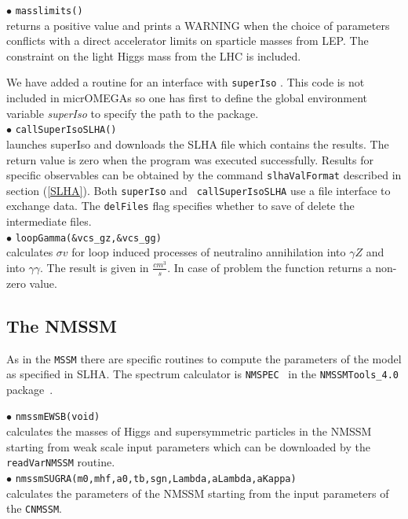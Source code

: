 \documentclass[12pt,a4paper]{article}
\begin{document}
 
\noi$\bullet$ \verb|masslimits()|\\
returns a positive value  and
 prints a WARNING when the choice of parameters conflicts with a
direct accelerator limits on sparticle masses from LEP.
The constraint on the light Higgs mass from the LHC is included.  

We have added a routine for an interface with {\tt superIso}
\cite{Arbey:2011zz}. This code is not 
included in micrOMEGAs so one has first to define 
the global environment  variable {\it superIso} 
to specify the path to the package.\\ 
\noi$\bullet$ \verb|callSuperIsoSLHA()|\\
launches superIso and downloads the SLHA file which  contains the results. The
return value is zero when the program was  executed successfully.  Results
for specific  observables can be obtained by the command {\tt slhaValFormat}
described in  section (\ref{SLHA}).  Both {\tt superIso} and {\tt
callSuperIsoSLHA} use a file interface to exchange data. The {\tt delFiles} flag specifies whether
to save of delete the intermediate files.\\
\noi$\bullet$ \verb|loopGamma(&vcs_gz,&vcs_gg)|\\
calculates $\sigma v$ for  loop induced processes of neutralino
annihilation into $\gamma Z$ and into $\gamma \gamma$. The result is given in  
$\frac{cm^3}{s}$. In case of problem the function returns a non-zero value. 

\subsection{The NMSSM}

As in the {\tt MSSM} there are specific routines to compute the  
parameters of the model as  specified in SLHA. The spectrum calculator is \verb|NMSPEC|~\cite{Ellwanger:2006rn}
 in the \verb|NMSSMTools_4.0| package~\cite{nmssmtools}.

\noindent$\bullet$ \verb|nmssmEWSB(void)|\\
calculates the masses of Higgs and supersymmetric particles in the NMSSM
starting from weak scale input parameters which can be downloaded by the 
{\tt readVarNMSSM} routine.~\cite{Ellwanger:2005dv}\\   
\noindent$\bullet$ \verb|nmssmSUGRA(m0,mhf,a0,tb,sgn,Lambda,aLambda,aKappa)|\\
calculates the parameters of the NMSSM starting from the input parameters of 
the \verb|CNMSSM|.
\end{document}
